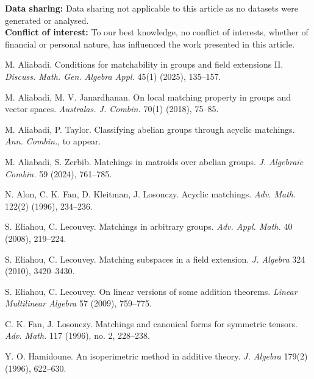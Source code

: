 \documentclass[11pt]{amsart}
\theoremstyle{definition}
\theoremstyle{remark}
\begin{document}
\noindent \textbf{Data sharing:} Data sharing not applicable to this article as no datasets were generated or analysed.\\
\textbf{Conflict of interest:} To our best knowledge, no conflict of interests, whether of financial or personal nature, has influenced the work presented in this article.





\begin{thebibliography}{10}





M. Aliabadi. Conditions for matchability in groups and field extensions II. \textit{Discuss. Math. Gen. Algebra Appl.} 45(1) (2025), 135--157.

M. Aliabadi, M. V. Janardhanan. On local matching property in groups and vector spaces. \textit{Australas. J. Combin.} 70(1) (2018), 75--85.

M. Aliabadi, P. Taylor. Classifying abelian groups through acyclic matchings. \textit{Ann. Combin.}, to appear.

M. Aliabadi, S. Zerbib. Matchings in matroids over abelian groups. \textit{J. Algebraic Combin.} 59 (2024), 761--785.

N. Alon, C. K. Fan, D. Kleitman, J. Losonczy. Acyclic matchings. \textit{Adv. Math.} 122(2) (1996), 234--236.

S. Eliahou, C. Lecouvey. Matchings in arbitrary groups. \textit{Adv. Appl. Math.} 40 (2008), 219--224.

S. Eliahou, C. Lecouvey. Matching subspaces in a field extension. \textit{J. Algebra} 324 (2010), 3420--3430.

S. Eliahou, C. Lecouvey. On linear versions of some addition theorems. \textit{Linear Multilinear Algebra} 57 (2009), 759--775.

C. K. Fan, J. Losonczy. Matchings and canonical forms for symmetric tensors. \textit{Adv. Math.} 117 (1996), no. 2, 228--238.


Y. O. Hamidoune. An isoperimetric method in additive theory. \textit{J. Algebra} 179(2) (1996), 622--630.


\end{thebibliography}
\end{document}
